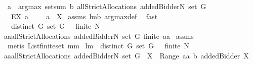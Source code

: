 \begin{isabellebody}
{\isacharampersand}\ {\isacharparenleft}a\ {\isasymin}\ argmax\ {\isacharparenleft}setsum\ b{\isacharparenright}\ {\isacharparenleft}allStrictAllocations{\isacharprime}\ {\isacharparenleft}{\isacharbraceleft}addedBidder{\isacharprime}{\isacharbraceright}{\isasymunion}N{\isacharparenright}\ {\isacharparenleft}set\ G{\isacharparenright}{\isacharparenright}{\isacharparenright}\isanewline
{\isacharparenright}{\isachardoublequoteclose}\ {\isacharparenleft}\ {\isachardoublequoteopen}EX\ a{\isachardot}\ {\isacharunderscore}\ {\isacharampersand}\ {\isacharunderscore}\ {\isacharampersand}\ a\ {\isasymin}\ {\isacharquery}X{\isachardoublequoteclose}{\isacharparenright}\isanewline
%
\isadelimproof
%
\endisadelimproof
%
\isatagproof
{}\isamarkupfalse%
\ assms\ lm{}{}b\ argmax{\isacharunderscore}def\ \isamarkupfalse%
\ fast%
\endisatagproof
{\isafoldproof}%
%
\isadelimproof
\isanewline
%
\endisadelimproof
\isanewline
{}\isamarkupfalse%
\ \ {\isachardoublequoteopen}distinct\ G{\isachardoublequoteclose}\ {\isachardoublequoteopen}set\ G\ {\isasymnoteq}\ {\isacharbraceleft}{\isacharbraceright}{\isachardoublequoteclose}\ {\isachardoublequoteopen}finite\ N{\isachardoublequoteclose}\ \ \isanewline
{\isachardoublequoteopen}{\isasymforall}aa{\isasymin}allStrictAllocations{\isacharprime}\ {\isacharparenleft}{\isacharbraceleft}addedBidder{\isacharprime}{\isacharbraceright}{\isasymunion}N{\isacharparenright}\ {\isacharparenleft}set\ G{\isacharparenright}{\isachardot}\ finite\ aa{\isachardoublequoteclose}\isanewline
%
\isadelimproof
%
\endisadelimproof
%
\isatagproof
{}\isamarkupfalse%
\ assms\ \isamarkupfalse%
\ {\isacharparenleft}metis\ List{\isachardot}finite{\isacharunderscore}set\ mm{}{}{\isacharparenright}%
\endisatagproof
{\isafoldproof}%
%
\isadelimproof
\isanewline
%
\endisadelimproof
\isanewline
{}\isamarkupfalse%
\ lm{}{}{\isacharcolon}\ \ {\isachardoublequoteopen}distinct\ G{\isachardoublequoteclose}\ {\isachardoublequoteopen}set\ G\ {\isasymnoteq}\ {\isacharbraceleft}{\isacharbraceright}{\isachardoublequoteclose}\ {\isachardoublequoteopen}finite\ N{\isachardoublequoteclose}\ \isanewline
{\isachardoublequoteopen}{\isasymforall}aa{\isasymin}allStrictAllocations{\isacharprime}\ {\isacharparenleft}{\isacharbraceleft}addedBidder{\isacharprime}{\isacharbraceright}{\isasymunion}N{\isacharparenright}\ {\isacharparenleft}set\ G{\isacharparenright}{\isachardot}\ {\isasymforall}\ X\ {\isasymin}\ Range\ aa{\isachardot}\ b\ {\isacharparenleft}addedBidder{\isacharprime}{\isacharcomma}\ X{\isacharparenright}{\isacharequal}{}{\isachardoublequoteclose}\isanewline

\end{isabellebody}
